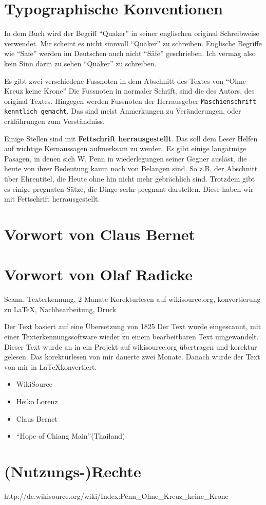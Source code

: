 \chapter{Typographische Konventionen}

In dem Buch wird der Begriff "`Quaker"'  in seiner englischen original Schreibweise verwendet. Mir scheint es nicht sinnvoll "`Quäker"' zu schreiben. Englische Begriffe wie "`Safe"' werden im Deutschen auch nicht "`Säfe"' geschrieben. Ich vermag also kein Sinn darin zu sehen "`Quäker"' zu schreiben.

\medskip

Es gibt zwei verschiedene Fussnoten in dem Abschnitt des Textes von "`Ohne Kreuz keine Krone"' Die Fussnoten in normaler Schrift, sind die des Autors, des original Textes. Hingegen werden Fussnoten der Herrausgeber \texttt{Maschienschrift kenntlich gemacht}. Das sind meist Anmerkungen zu Veränderungen, oder erklährungen zum Verständniss.

\medskip

Einige Stellen sind mit \textbf{Fettschrift herrausgestellt}. Das soll dem Leser Helfen auf wichtige Kernaussagen aufmerksam zu werden. Es gibt einige langatmige Pasagen, in denen sich W. Penn in wiederlegungen seiner Gegner ausläst, die heute von ihrer Bedeutung kaum noch von Belangen sind. So z.B. der Abschnitt über Ehrentitel, die Heute ohne hin nicht mehr gebrächlich sind. Trotzdem gibt es einige pregnaten Sätze, die Dinge serhr pregnant darstellen. Diese haben wir mit Fettschrift herrausgestellt.

\chapter{Vorwort von Claus Bernet}


\chapter{Vorwort von Olaf Radicke}


Scann, Texterkennung, 2 Manate Korekturlesen auf wikisource.org, konvertierung
zu LaTeX, Nachbearbeitung, Druck



Der Text basiert auf eine Übersetzung von 1825
Der
Text wurde eingescannt, mit einer Texterkennungssoftware wieder zu einem
bearbeitbaren Text umgewandelt. Dieser Text wurde an in ein Projekt auf
wikisource.org übertragen und korektur gelesen. Das korekturlesen von mir
dauerte zwei Monate. Danach wurde der Text von mir in \LaTeX konvertiert.


\medskip


\begin{itemize}
 \item WikiSource
 \item Heiko Lorenz
 \item Claus Bernet
 \item "`Hope of Chiang Main"'(Thailand)
\end{itemize}


\chapter{(Nutzungs-)Rechte}
http://de.wikisource.org/wiki/Index:Penn\_Ohne\_Kreuz\_keine\_Krone
